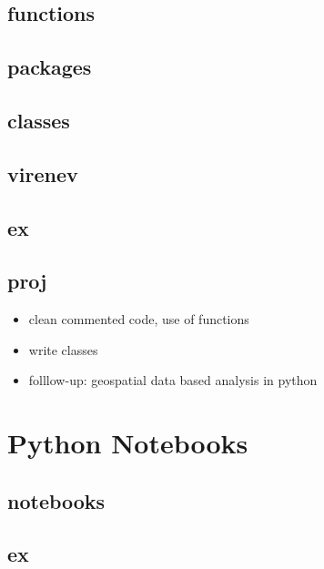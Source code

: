 \documentclass[
]{book}
\providecommand{\tightlist}{%
  \setlength{\itemsep}{0pt}\setlength{\parskip}{0pt}}
\begin{document}
\hypertarget{functions}{%
\section{functions}\label{functions}}

\hypertarget{packages}{%
\section{packages}\label{packages}}

\hypertarget{classes}{%
\section{classes}\label{classes}}

\hypertarget{virenev}{%
\section{virenev}\label{virenev}}

\hypertarget{ex}{%
\section{ex}\label{ex}}

\hypertarget{proj-1}{%
\section{proj}\label{proj-1}}

\begin{itemize}
\tightlist
\item
  clean commented code, use of functions
\item
  write classes
\item
  folllow-up: geospatial data based analysis in python
\end{itemize}

\hypertarget{python-notebooks}{%
\chapter{Python Notebooks}\label{python-notebooks}}

\hypertarget{notebooks}{%
\section{notebooks}\label{notebooks}}

\hypertarget{ex-1}{%
\section{ex}\label{ex-1}}
\end{document}
